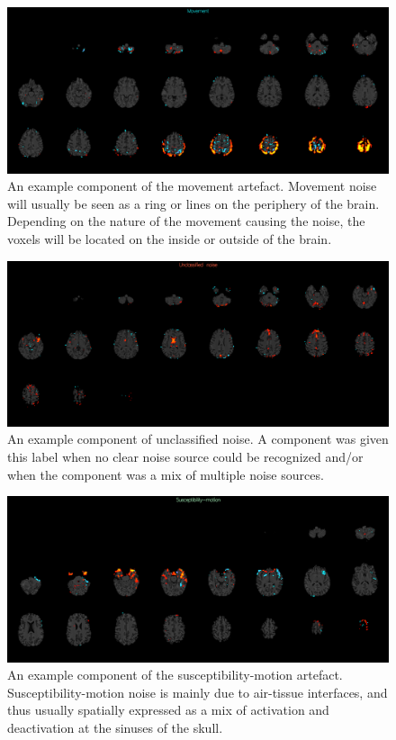 \begin{figure}[H]                 
	\includegraphics[width=.85\textwidth]{figures/bMethods/Movement}  
	\caption{An example component of the movement artefact. Movement noise will usually be seen as a ring or lines on the periphery of the brain. Depending on the nature of the movement causing the noise, the voxels will be located on the inside or outside of the brain.}
	\label{fig:meth:Movement} 
\end{figure}

\begin{figure}[H]                 
	\includegraphics[width=.85\textwidth]{figures/bMethods/U_noise}  
	\caption{An example component of unclassified noise. A component was given this label when no clear noise source could be recognized and/or when the component was a mix of multiple noise sources.}
	\label{fig:meth:Unoise} 
\end{figure}


\begin{figure}[H]                 
	\includegraphics[width=.85\textwidth]{figures/bMethods/Susceptibility_motion}  
	\caption{An example component of the susceptibility-motion artefact. Susceptibility-motion noise is mainly due to air-tissue interfaces, and thus usually spatially expressed as a mix of activation and deactivation at the sinuses of the skull.}
	\label{fig:meth:sus} 
\end{figure}

